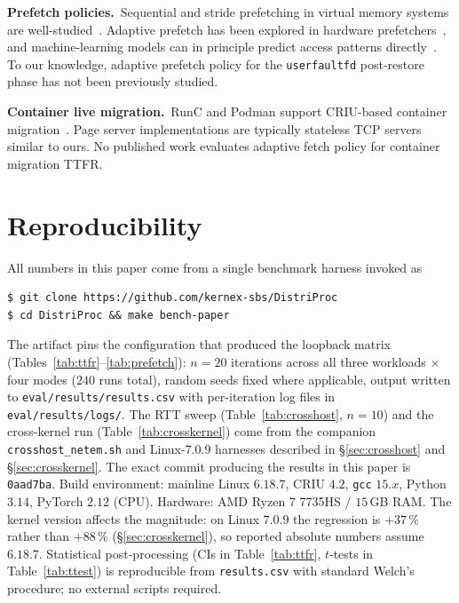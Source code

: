\documentclass[journal]{IEEEtran}
\newif\ifanon
\newcommand{\uffd}{\texttt{userfaultfd}\xspace}
\begin{document}
\textbf{Prefetch policies.}\, Sequential and stride prefetching in virtual
memory systems are well-studied~\cite{chen1995effective}. Adaptive
prefetch has been explored in hardware prefetchers~\cite{srinath2007feedback},
and machine-learning models can in principle predict access patterns
directly~\cite{hashemi2018learning}.
To our knowledge, adaptive prefetch policy for the \uffd post-restore
phase has not been previously studied.

\textbf{Container live migration.}\, RunC and Podman support CRIU-based
container migration~\cite{runc-lazy}. Page server implementations are
typically stateless TCP servers similar to ours. No published work
evaluates adaptive fetch policy for container migration TTFR.

\section{Reproducibility}
\label{sec:repro}

All numbers in this paper come from a single benchmark harness invoked as

\ifanon
\begin{lstlisting}[basicstyle=\small\ttfamily,frame=none]
$ git clone <repository-omitted-for-review>
$ cd DistriProc && make bench-paper
\end{lstlisting}
\else
\begin{lstlisting}[basicstyle=\small\ttfamily,frame=none]
$ git clone https://github.com/kernex-sbs/DistriProc
$ cd DistriProc && make bench-paper
\end{lstlisting}
\fi

\noindent The artifact pins the configuration that produced the loopback
matrix (Tables~\ref{tab:ttfr}--\ref{tab:prefetch}): $n\!=\!20$ iterations
across all three workloads $\times$ four modes ($240$ runs total), random
seeds fixed where applicable, output written to
\texttt{eval/results/results.csv} with per-iteration log files in
\texttt{eval/results/logs/}. The RTT sweep (Table~\ref{tab:crosshost},
$n\!=\!10$) and the cross-kernel run (Table~\ref{tab:crosskernel}) come from
the companion \texttt{crosshost\_netem.sh} and Linux-$7.0.9$ harnesses
described in \S\ref{sec:crosshost} and \S\ref{sec:crosskernel}.
The exact commit producing the results in this paper is
\texttt{0aad7ba}. Build environment: mainline Linux $6.18.7$, CRIU $4.2$,
\texttt{gcc} $15.x$, Python $3.14$, PyTorch $2.12$ (CPU). Hardware:
AMD Ryzen 7 7735HS / $15$\,GB RAM. The kernel version affects the
magnitude: on Linux $7.0.9$ the regression is $+37\,\%$ rather than
$+88\,\%$ (\S\ref{sec:crosskernel}), so reported absolute numbers assume
$6.18.7$.
Statistical post-processing (CIs in Table~\ref{tab:ttfr}, $t$-tests in
Table~\ref{tab:ttest}) is reproducible from \texttt{results.csv} with
standard Welch's procedure; no external scripts required.
\end{document}
